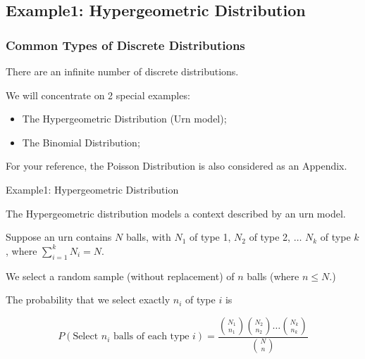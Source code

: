 \documentclass[t,xcolor=pdftex,dvipsnames,table]{beamer}
\begin{document}
\subsection{Example1: Hypergeometric Distribution}

\begin{frame}\frametitle{Common Types of Discrete Distributions}
There are an infinite number of discrete distributions. 

\vspace{0.5cm}
We will concentrate on 2 special examples: 
\begin{itemize}
\item The Hypergeometric Distribution (Urn model);
\item The Binomial Distribution;
\end{itemize}

For your reference, the Poisson Distribution is also considered as an Appendix.
\end{frame}

\begin{frame}[fragile]{Example1: Hypergeometric Distribution}

\begin{definition}
The \alert{Hypergeometric distribution} models a context described by an urn model.

\vspace{.5cm}
Suppose an urn contains $N$ balls, with $N_{1}$ of type 1, $N_{2}$ of type 2, $\ldots$ $N_{k}$ of type $k$, where $\sum_{i=1}^{k} N_{i} = N$.

\vspace{.5cm}
We select a random sample (without replacement) of $n$ balls (where $n \leq N$.)

\vspace{.5cm}
The probability that we select exactly $n_{i}$ of type $i$ is 

\[ P( \mbox{Select $n_{i}$ balls of each type $i$} )   = 
\frac{ { N_{1} \choose n_{1}}  {N_{2} \choose n_{2}} \ldots {N_{k} \choose n_{k}}  }{ {N \choose n} }
\]

\end{definition}
\hyperlink{Factorials}{}
\hyperlink{BinomialCoefficients}{}
\end{frame}
\end{document}
